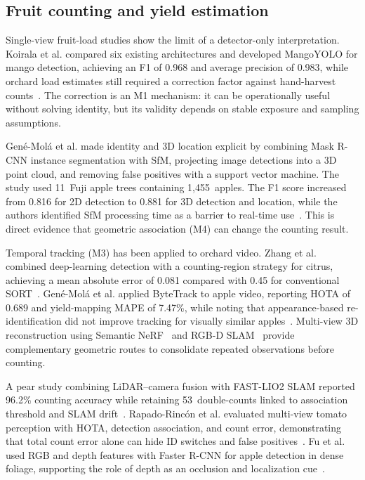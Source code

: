\subsection{Fruit counting and yield estimation}

Single-view fruit-load studies show the limit of a detector-only interpretation. Koirala et al. compared six existing architectures and developed MangoYOLO for mango detection, achieving an F1 of 0.968 and average precision of 0.983, while orchard load estimates still required a correction factor against hand-harvest counts~\cite{koirala2019deepfruit}. The correction is an M1 mechanism: it can be operationally useful without solving identity, but its validity depends on stable exposure and sampling assumptions.

Gené-Molá et al. made identity and 3D location explicit by combining Mask R-CNN instance segmentation with SfM, projecting image detections into a 3D point cloud, and removing false positives with a support vector machine. The study used 11~Fuji apple trees containing 1,455~apples. The F1 score increased from 0.816 for 2D detection to 0.881 for 3D detection and location, while the authors identified SfM processing time as a barrier to real-time use~\cite{genemola2020fruit3d}. This is direct evidence that geometric association (M4) can change the counting result.

Temporal tracking (M3) has been applied to orchard video. Zhang et al. combined deep-learning detection with a counting-region strategy for citrus, achieving a mean absolute error of 0.081 compared with 0.45 for conventional SORT~\cite{ledger_r_ee550a3e3a6fb318}. Gené-Molá et al. applied ByteTrack to apple video, reporting HOTA of 0.689 and yield-mapping MAPE of 7.47\%, while noting that appearance-based re-identification did not improve tracking for visually similar apples~\cite{ledger_r_2d972b94554c6cd1}. Multi-view 3D reconstruction using Semantic NeRF~\cite{ledger_m_1210e3ea00486b68} and RGB-D SLAM~\cite{ledger_r_b2e0e9aabad17a97} provide complementary geometric routes to consolidate repeated observations before counting.

A pear study combining LiDAR--camera fusion with FAST-LIO2 SLAM reported 96.2\% counting accuracy while retaining 53~double-counts linked to association threshold and SLAM drift~\cite{ledger_r_d4270ea8ab11f268}. Rapado-Rincón et al. evaluated multi-view tomato perception with HOTA, detection association, and count error, demonstrating that total count error alone can hide ID switches and false positives~\cite{ledger_r_700d34dae0f20d78}. Fu et al. used RGB and depth features with Faster R-CNN for apple detection in dense foliage, supporting the role of depth as an occlusion and localization cue~\cite{fu2020apple}.

